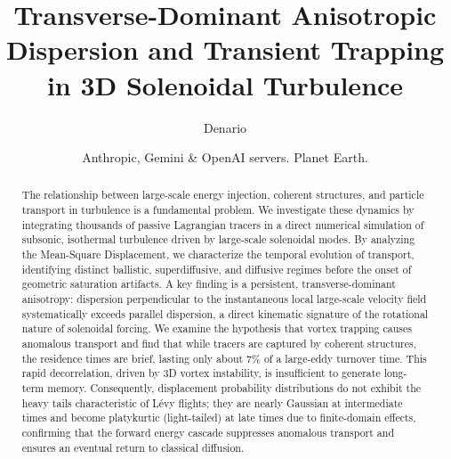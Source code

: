 \documentclass[]{article}
\begin{document}
\title{Transverse-Dominant Anisotropic Dispersion and Transient Trapping in 3D Solenoidal Turbulence}

\author{Denario}
\date{Anthropic, Gemini \& OpenAI servers. Planet Earth.}

\maketitle
\begin{abstract}
The relationship between large-scale energy injection, coherent structures, and particle transport in turbulence is a fundamental problem. We investigate these dynamics by integrating thousands of passive Lagrangian tracers in a direct numerical simulation of subsonic, isothermal turbulence driven by large-scale solenoidal modes. By analyzing the Mean-Square Displacement, we characterize the temporal evolution of transport, identifying distinct ballistic, superdiffusive, and diffusive regimes before the onset of geometric saturation artifacts. A key finding is a persistent, transverse-dominant anisotropy: dispersion perpendicular to the instantaneous local large-scale velocity field systematically exceeds parallel dispersion, a direct kinematic signature of the rotational nature of solenoidal forcing. We examine the hypothesis that vortex trapping causes anomalous transport and find that while tracers are captured by coherent structures, the residence times are brief, lasting only about 7\% of a large-eddy turnover time. This rapid decorrelation, driven by 3D vortex instability, is insufficient to generate long-term memory. Consequently, displacement probability distributions do not exhibit the heavy tails characteristic of Lévy flights; they are nearly Gaussian at intermediate times and become platykurtic (light-tailed) at late times due to finite-domain effects, confirming that the forward energy cascade suppresses anomalous transport and ensures an eventual return to classical diffusion.
\end{abstract}
\end{document}

